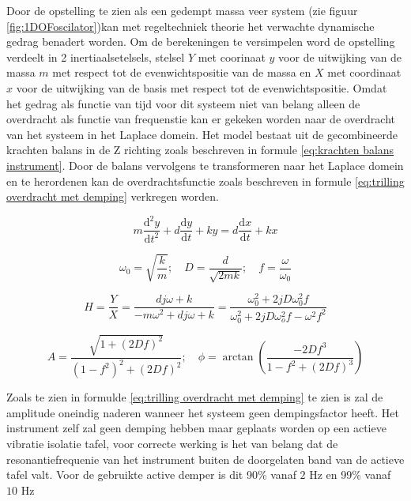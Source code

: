 \documentclass[11pt]{article}
\begin{document}
Door de opstelling te zien als een gedempt massa veer system (zie figuur \ref{fig:1DOFoscilator})kan met regeltechniek theorie het verwachte dynamische gedrag benadert worden. 
Om de berekeningen te versimpelen word de opstelling verdeelt in 2 inertiaalsetelsels, stelsel $Y$ met coorinaat $y$ voor de uitwijking van de massa $m$ met respect tot de evenwichtspositie van de massa en $X$ met coordinaat $x$ voor de uitwijking van de basis met respect tot de evenwichtspositie.
Omdat het gedrag als functie van tijd voor dit systeem niet van belang alleen de overdracht als functie van frequenstie kan er gekeken worden naar de overdracht van het systeem in het Laplace domein.
Het model bestaat uit de gecombineerde krachten balans in de Z richting zoals beschreven in formule \ref{eq:krachten balans instrument}.
Door de balans vervolgens te transformeren naar het Laplace domein en te herordenen kan de overdrachtsfunctie zoals beschreven in formule \ref{eq:trilling overdracht met demping} verkregen worden.

\begin{equation}
    m \frac{\mathrm{d}^2 y}{\mathrm{d} t^2} + d \frac{\mathrm{d}y}{\mathrm{d}t} +ky = d\frac{\mathrm{d}x}{\mathrm{d}t} + kx
    \label{eq:krachten balans instrument}
\end{equation}

\begin{equation}
    \omega_0 = \sqrt{\frac{k}{m}}; \quad D = \frac{d}{\sqrt{2mk}}; \quad f = \frac{\omega}{\omega_0}
\end{equation}

\begin{equation}
    H = \frac{Y}{X} = \frac{dj\omega + k}{-m\omega^2 +dj\omega + k} = \frac{\omega_0^2 + 2jD\omega_0^2 f}{\omega_0^2 + 2jD\omega_o^2 f - \omega^2 f^2}
    \label{eq:trilling overdracht met demping}
\end{equation}


\begin{equation}
    A = \frac{\sqrt{1 + (2Df)^2}}{(1-f^2)^2 + (2Df)^2}; \quad \phi = \arctan\left(\frac{-2Df^3}{1-f^2 + (2Df)^3}\right)
\end{equation}

Zoals te zien in formulde \ref{eq:trilling overdracht met demping} te zien is zal de amplitude oneindig naderen wanneer het systeem geen dempingsfactor heeft. Het instrument zelf zal geen demping hebben maar geplaats worden op een actieve vibratie isolatie tafel, voor correcte werking is het van belang dat de resonantiefrequenie van het instrument buiten de doorgelaten band van de actieve tafel valt. Voor de gebruikte active demper is dit 90\% vanaf $2$ Hz en 99\% vanaf $10$ Hz \citep{DVIATTabletopActive}
\end{document}
